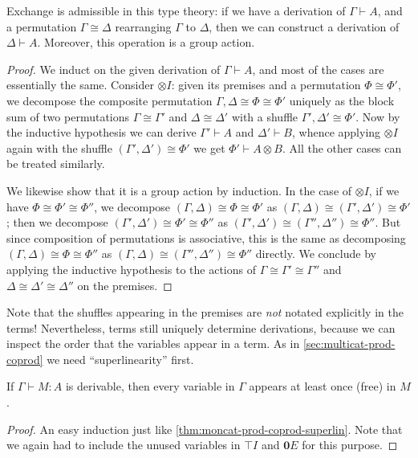 \documentclass{book}
\let\types\vdash
\def\unit{\top}%
\def\zero{\mathbf{0}}
\let\tensor\otimes
\def\tensorI{\mathord{\tensor}I}
\begin{document}
\begin{lem}\label{thm:smc-exchadm}
  Exchange is admissible in this type theory: if we have a derivation of $\Gamma\types A$, and a permutation $\Gamma\cong \Delta$ rearranging $\Gamma$ to $\Delta$, then we can construct a derivation of $\Delta\types A$.
  Moreover, this operation is a group action.
\end{lem}
\begin{proof}
  We induct on the given derivation of $\Gamma\types A$, and most of the cases are essentially the same.
  Consider $\tensorI$: given its premises and a permutation $\Phi\cong\Phi'$, we decompose the composite permutation $\Gamma,\Delta\cong \Phi\cong\Phi'$ uniquely as the block sum of two permutations $\Gamma\cong \Gamma'$ and $\Delta\cong\Delta'$ with a shuffle $\Gamma',\Delta' \cong \Phi'$.
  Now by the inductive hypothesis we can derive $\Gamma'\types A$ and $\Delta'\types B$, whence applying $\tensorI$ again with the shuffle $(\Gamma',\Delta') \cong \Phi'$ we get $\Phi' \types A\tensor B$.
  All the other cases can be treated similarly.

  We likewise show that it is a group action by induction.
  In the case of $\tensorI$, if we have $\Phi\cong \Phi'\cong\Phi''$, we decompose $(\Gamma,\Delta)\cong \Phi\cong \Phi'$ as $(\Gamma,\Delta)\cong (\Gamma',\Delta')\cong\Phi'$; then we decompose $(\Gamma',\Delta')\cong\Phi' \cong \Phi''$ as $(\Gamma',\Delta')\cong (\Gamma'',\Delta'')\cong\Phi''$.
  But since composition of permutations is associative, this is the same as decomposing $(\Gamma,\Delta)\cong \Phi\cong \Phi''$ as $(\Gamma,\Delta)\cong (\Gamma'',\Delta'')\cong \Phi''$ directly.
  We conclude by applying the inductive hypothesis to the actions of $\Gamma\cong \Gamma'\cong \Gamma''$ and $\Delta\cong \Delta'\cong\Delta''$ on the premises.
\end{proof}

Note that the shuffles appearing in the premises are \emph{not} notated explicitly in the terms!
Nevertheless, terms still uniquely determine derivations, because we can inspect the order that the variables appear in a term.
As in \cref{sec:multicat-prod-coprod} we need ``superlinearity'' first.

\begin{lem}\label{thm:smc-superlin}
  If $\Gamma\types M:A$ is derivable, then every variable in $\Gamma$ appears at least once (free) in $M$.
\end{lem}
\begin{proof}
  An easy induction just like \cref{thm:moncat-prod-coprod-superlin}.
  Note that we again had to include the unused variables in $\unit I$ and $\zero E$ for this purpose.
\end{proof}
\end{document}
